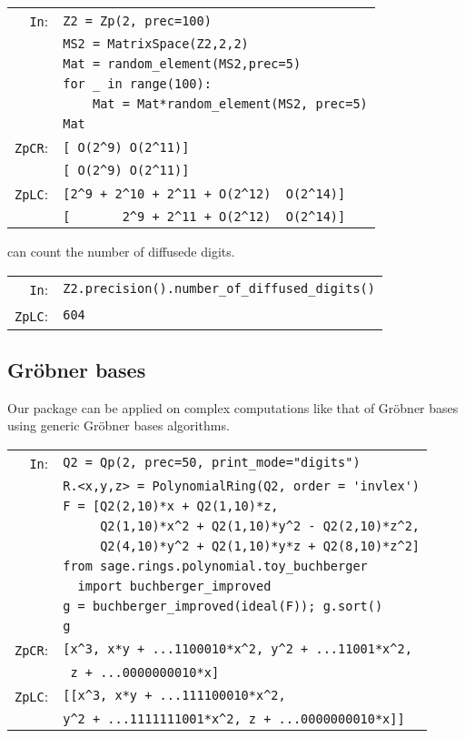 \documentclass[sigconf]{acmart}
\newcommand{\ZpL}{\text{\rm \tt ZpL}\xspace}
\newcommand{\cIn}{{\color{blue} \tt \phantom{Zp}In}:}
\newcommand{\cZpCR}{{\color{red} \tt ZpCR}:}
\newcommand{\cZpLC}{{\color{red} \tt ZpLC}:}
\theoremstyle{definition}
\begin{document}
\begin{tabular}{rl}
\cIn
 & \verb?Z2 = Zp(2, prec=100)? \\
 & \verb?MS2 = MatrixSpace(Z2,2,2)? \\
 & \verb?Mat = random_element(MS2,prec=5)? \\
 & \verb?for _ in range(100):? \\
 & \verb?    Mat = Mat*random_element(MS2, prec=5)? \\
 & \verb?Mat? \\
\cZpCR
 & \verb?[ O(2^9) O(2^11)]? \\
 & \verb?[ O(2^9) O(2^11)]? \\
\cZpLC
 & \verb?[2^9 + 2^10 + 2^11 + O(2^12)  O(2^14)]? \\
 & \verb?[       2^9 + 2^11 + O(2^12)  O(2^14)]? \\
\end{tabular}

\ZpL can count the number of diffusede digits.


\begin{tabular}{rl}
\cIn
 & \verb?Z2.precision().number_of_diffused_digits()? \\
\cZpLC
 & \verb?604? \\
\end{tabular}


\subsection{Gröbner bases}
Our package can be applied 
on complex computations like that of
Gröbner bases using generic
Gröbner bases algorithms.

\begin{tabular}{rl}
\cIn
 & \verb?Q2 = Qp(2, prec=50, print_mode="digits")? \\
 & \verb?R.<x,y,z> = PolynomialRing(Q2, order = 'invlex')? \\
 & \verb?F = [Q2(2,10)*x + Q2(1,10)*z, ? \\
 & \verb?     Q2(1,10)*x^2 + Q2(1,10)*y^2 - Q2(2,10)*z^2,? \\
 & \verb?     Q2(4,10)*y^2 + Q2(1,10)*y*z + Q2(8,10)*z^2]? \\
 & \verb?from sage.rings.polynomial.toy_buchberger?\\
 &\verb?  import buchberger_improved? \\
 & \verb?g = buchberger_improved(ideal(F)); g.sort()? \\
 & \verb?g? \\
\cZpCR
 & \verb?[x^3, x*y + ...1100010*x^2, y^2 + ...11001*x^2,? \\
 & \verb? z + ...0000000010*x]? \\
\cZpLC
 & \verb?[[x^3, x*y + ...111100010*x^2,? \\
 & \verb?y^2 + ...1111111001*x^2, z + ...0000000010*x]]? \\
\end{tabular}
\end{document}
